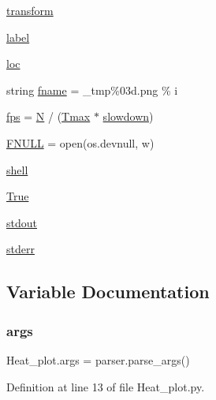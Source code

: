 \begin{DoxyCompactItemize}
\hyperlink{namespaceHeat__plot_aeaa6785bedcad63b4bd40e8cb1bad8a0}{transform}
\item 
\hyperlink{namespaceHeat__plot_abfde0ea5b1da0c081d5643f0bce5aa3c}{label}
\item 
\hyperlink{namespaceHeat__plot_aa109fec5bb7f2e730396a2cb623b2ad2}{loc}
\item 
string \hyperlink{namespaceHeat__plot_a276f032cea9a4b8cf77208d165379e83}{fname} = \textquotesingle{}\+\_\+tmp\%03d.\+png\textquotesingle{} \% i
\item 
\hyperlink{namespaceHeat__plot_a72be6747bea28a4edbd944d4f76fec68}{fps} = \hyperlink{namespaceHeat__plot_a7d050092798e28458a263710837bda77}{N} / (\hyperlink{namespaceHeat__plot_a4af99e02cb1eac65ec68fab8d5446c4a}{Tmax} $\ast$ \hyperlink{namespaceHeat__plot_a116214d215b6a0e66aefae82e2bbd4ef}{slowdown})
\item 
\hyperlink{namespaceHeat__plot_aa171991dbe2271ffea72d0f8b97d2876}{F\+N\+U\+LL} = open(os.\+devnull, \textquotesingle{}w\textquotesingle{})
\item 
\hyperlink{namespaceHeat__plot_ae6ae986b39e93cfae8063da8f1ac65f7}{shell}
\item 
\hyperlink{namespaceHeat__plot_a05e302d2a0017c90ec20981f7474cc46}{True}
\item 
\hyperlink{namespaceHeat__plot_a234d0e0e9df8fdb1fb7d9f280b7949d1}{stdout}
\item 
\hyperlink{namespaceHeat__plot_a67f420128d52c92a8f2e47e60a49efcc}{stderr}
\end{DoxyCompactItemize}


\subsection{Variable Documentation}
\mbox{\label{namespaceHeat__plot_a91091fe60dbdb0842f9b23f99fab028b}} 
\subsubsection{\texorpdfstring{args}{args}}
{\footnotesize\ttfamily Heat\+\_\+plot.\+args = parser.\+parse\+\_\+args()}



Definition at line 13 of file Heat\+\_\+plot.\+py.

\mbox{\label{namespaceHeat__plot_acaf53b467a0a1fb124babb16a64f4d1b}} 

